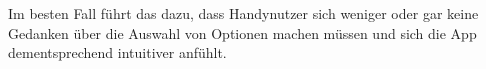 	Im besten Fall führt das dazu, dass Handynutzer sich weniger oder gar keine Gedanken über die Auswahl von Optionen machen müssen und sich die App dementsprechend intuitiver anfühlt.%
%
%
%
%
%
%
%
%	
%	
%
